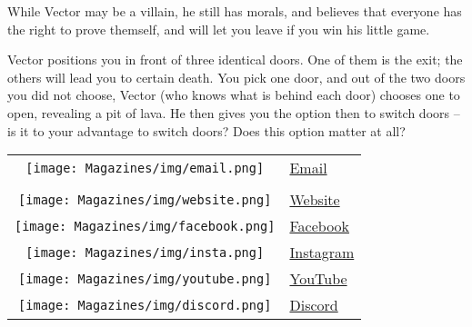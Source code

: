 \documentclass{article}
\begin{document}
\begin{multicols}{3}
While Vector may be a villain, he still has morals, and believes that everyone has the right to prove themself, and will let you leave if you win his little game. 

Vector positions you in front of three identical doors. One of them is the exit; the others will lead you to certain death. You pick one door, and out of the two doors you did not choose, Vector (who knows what is behind each door) chooses one to open, revealing a pit of lava. He then gives you the option then to switch doors -- is it to your advantage to switch doors? Does this option matter at all?
\closearticle

\vspace{1.0cm}
\begin{tabular}{c l}
  \texttt{[image: Magazines/img/email.png]}
    & \href{mailto:seattleinfinitymathcircle@gmail.com}{Email}\\
  \;\\
  \texttt{[image: Magazines/img/website.png]}
    & \href{https://seattleinfinity.org}{Website} \\
  \texttt{[image: Magazines/img/facebook.png]}
    & \href{https://www.facebook.com/simathcircle/}{Facebook} \\
  \texttt{[image: Magazines/img/insta.png]}
    & \href{https://www.instagram.com/seattleinfinitymathcircle/}{Instagram} \\
  \texttt{[image: Magazines/img/youtube.png]}
    & \href{https://www.youtube.com/channel/UCgwA-iysWPc_XG0R0AZ5z5g/videos}{YouTube} \\
  \texttt{[image: Magazines/img/discord.png]}
    & \href{https://discord.gg/2Ma3dURhTt}{Discord} 
\end{tabular}

\end{multicols}
\end{document}
